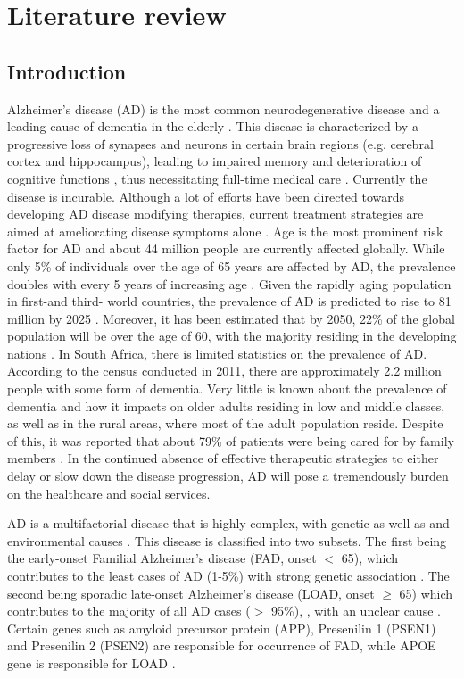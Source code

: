\chapter{Literature review}
\section{Introduction}
Alzheimer’s disease (AD) is the most common neurodegenerative disease and a leading cause of dementia in the elderly \citep{andrieu2015}. This disease is characterized by a progressive loss of synapses and neurons in certain brain regions (e.g. cerebral cortex and hippocampus), leading to impaired memory and deterioration of cognitive functions \citep{dekosky1990,scheff2006,zare-shahabadi2015}, thus necessitating full-time medical care \citep{prince2013}. Currently the disease is incurable. Although a lot of efforts have been directed towards developing AD disease modifying therapies, current treatment strategies are aimed at ameliorating disease symptoms alone \citep{anand2014,disanto2013}. Age is the most prominent risk factor for AD and about 44 million people are currently affected globally. While only 5\% of individuals over the age of 65 years are affected by AD, the prevalence doubles with every 5 years of increasing age \citep{pimenova2018,qiu2009}. Given the rapidly aging population in first-and third- world countries, the prevalence of AD is predicted to rise to 81 million by 2025 \citep{AlzheimersAssociation2014,Ferri2005}. Moreover, it has been estimated that by 2050, 22\% of the global population will be over the age of 60, with the majority residing in the developing nations \citep{Annear2015,Paddick2013}. In South Africa, there is limited statistics on the prevalence of AD. According to the census conducted in 2011, there are approximately 2.2 million people with some form of dementia. Very little is known about the prevalence of dementia and how it impacts on older adults residing in low and middle classes, as well as in the rural areas, where most of the adult population reside. Despite of this, it was reported that about 79\% of patients were being cared for by family members \citep{Kalula2010}. In the continued absence of effective therapeutic strategies to either delay or slow down the disease progression, AD will pose a tremendously burden on the healthcare and social services. 

AD is a multifactorial disease that is highly complex, with genetic as well as and environmental causes \citep{Dorszewska2016}. This disease is classified into two subsets. The first being the early-onset Familial Alzheimer’s disease (FAD, onset $<$ 65), which contributes to the least cases of AD (1-5\%) with strong genetic association \citep{Musiek2015,Reitz2014,Swerdlow2007}. The second being sporadic late-onset Alzheimer’s disease (LOAD, onset $\geq$ 65) which contributes to the majority of all AD cases ($>$ 95\%), \citep{Musiek2015,Reitz2014,Swerdlow2007}, with an unclear cause \citep{Dorszewska2016,pimenova2018}. Certain genes such as amyloid precursor protein (APP), Presenilin 1 (PSEN1) and Presenilin 2  (PSEN2) are responsible for occurrence of FAD, while APOE gene is responsible for LOAD \citep{Dorszewska2016}.

